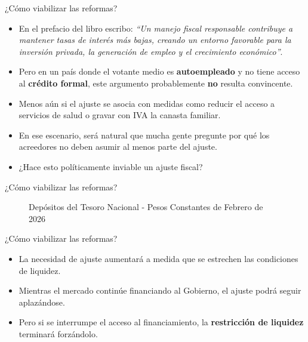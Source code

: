 \begin{frame}{¿Cómo viabilizar las reformas?}
\begin{itemize}
    \item En el prefacio del libro escribo: \textit{``Un manejo fiscal responsable contribuye a mantener tasas de interés más bajas, creando un entorno favorable para la inversión privada, la generación de empleo y el crecimiento económico''}.
    \item Pero en un país donde el votante medio es \textbf{autoempleado} y no tiene acceso al \textbf{crédito formal}, este argumento probablemente \textbf{no} resulta convincente.
    \item Menos aún si el ajuste se asocia con medidas como reducir el acceso a servicios de salud o gravar con IVA la canasta familiar.
    \item En ese escenario, será natural que mucha gente pregunte por qué los acreedores no deben asumir al menos parte del ajuste.
    \item ¿Hace esto políticamente inviable un ajuste fiscal?
\end{itemize}
\end{frame}


\begin{frame}{¿Cómo viabilizar las reformas?}
    \begin{figure}
        \centering
        \resizebox{0.76\textwidth}{!}{}
        \caption{Depósitos del Tesoro Nacional - Pesos Constantes de Febrero de 2026}
        \label{fig:despositos}
    \end{figure}
\end{frame}


\begin{frame}{¿Cómo viabilizar las reformas?}
    \begin{itemize}
        \item La necesidad de ajuste aumentará a medida que se estrechen las condiciones de liquidez.
        \item Mientras el mercado continúe financiando al Gobierno, el ajuste podrá seguir aplazándose.
        \item Pero si se interrumpe el acceso al financiamiento, la \textbf{restricción de liquidez} terminará forzándolo.
    \end{itemize}
\end{frame}

